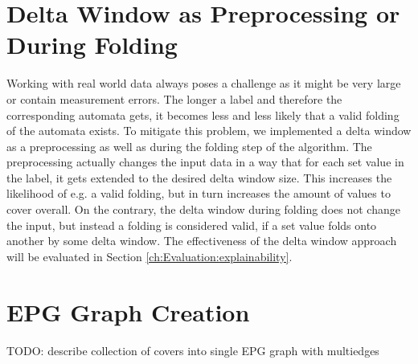 \section{Delta Window as Preprocessing or During Folding}
\label{ch:novel-algos:delta-window}
Working with real world data always poses a challenge as it might be very large or contain measurement errors.
The longer a label and therefore the corresponding automata gets, it becomes less and less likely that a valid folding of the automata exists.
To mitigate this problem, we implemented a delta window as a preprocessing as well as during the folding step of the algorithm.
The preprocessing actually changes the input data in a way that for each set value in the label, it gets extended to the desired delta window size.
This increases the likelihood of e.g. a valid folding, but in turn increases the amount of values to cover overall. On the contrary, the delta window during folding does not change the input, but instead a folding is considered valid, if a set value folds onto another by some delta window.
The effectiveness of the delta window approach will be evaluated in Section \ref{ch:Evaluation:explainability}.

\section{EPG Graph Creation}
\label{ch:novel-algos:ept-graph}
TODO: describe collection of covers into single EPG graph with multiedges
